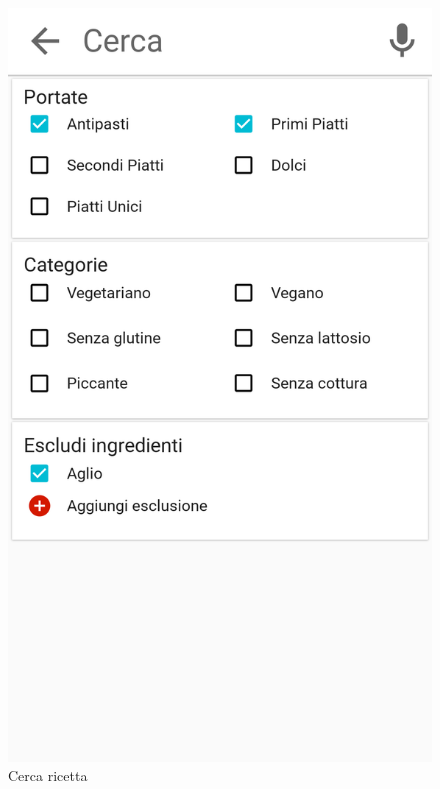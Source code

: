 \begin{figure}[H]
	
	\begin{minipage}{.49\textwidth}
		\includegraphics[width=\textwidth]{img/wireframe/search_page.png}
		\caption{Cerca ricetta}
	\end{minipage}
	\hfill
	\begin{minipage}{.49\textwidth}

\end{minipage}
\end{figure}
